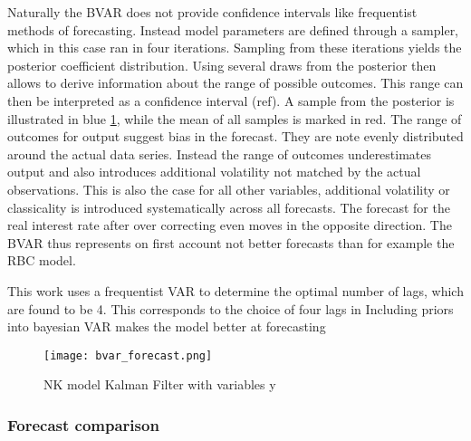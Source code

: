 \documentclass[12pt,a4paper,english]{article} %
\begin{document}
	Naturally the BVAR does not provide confidence intervals like frequentist methods of forecasting. Instead model parameters are defined through a sampler, which in this case ran in four iterations. Sampling from these iterations yields the posterior coefficient distribution. Using several draws from the posterior then allows to derive information about the range of possible outcomes. This range can then be interpreted as a confidence interval (ref).  
	A sample from the posterior is illustrated in blue \ref{fig:bvar}, while the mean of all samples is marked in red. The range of outcomes for output suggest bias in the forecast. They are note evenly distributed around the actual data series. Instead the range of outcomes underestimates output and also introduces additional volatility not matched by the actual observations. This is also the case for all other variables, additional volatility or classicality is introduced systematically across all forecasts. The forecast for the real interest rate after over correcting even moves in the opposite direction. 
	The BVAR thus represents on first account not better forecasts than for example the RBC model.
	
	This work uses a frequentist VAR to determine the optimal number of lags, which are found to be 4. This corresponds to the choice of four lags in \cite{chin_bayesian_2019}
	Including priors into bayesian VAR makes the model better at forecasting \cite{chin_bayesian_2019}
	
	\begin{figure}[H]
		\begin{center}
			\texttt{[image: bvar\_forecast.png]}
			\caption{NK model Kalman Filter with variables y}\label{fig:bvar}
		\end{center}
	\end{figure}
	
	\subsubsection{Forecast comparison}
	
\end{document}
